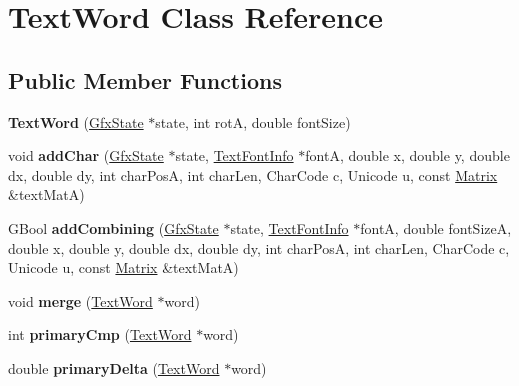\hypertarget{class_text_word}{}\section{Text\+Word Class Reference}
\label{class_text_word}
\subsection*{Public Member Functions}
\begin{DoxyCompactItemize}
\item 
\mbox{\label{class_text_word_a51bc923c6e3480cd018573e600261f74}} 
{\bfseries Text\+Word} (\hyperlink{class_gfx_state}{Gfx\+State} $\ast$state, int rotA, double font\+Size)
\item 
\mbox{\label{class_text_word_a66521a225689a5c12f66c81e25c1b551}} 
void {\bfseries add\+Char} (\hyperlink{class_gfx_state}{Gfx\+State} $\ast$state, \hyperlink{class_text_font_info}{Text\+Font\+Info} $\ast$fontA, double x, double y, double dx, double dy, int char\+PosA, int char\+Len, Char\+Code c, Unicode u, const \hyperlink{class_matrix}{Matrix} \&text\+MatA)
\item 
\mbox{\label{class_text_word_a161af72a57d83b89d424d17579ee97d3}} 
G\+Bool {\bfseries add\+Combining} (\hyperlink{class_gfx_state}{Gfx\+State} $\ast$state, \hyperlink{class_text_font_info}{Text\+Font\+Info} $\ast$fontA, double font\+SizeA, double x, double y, double dx, double dy, int char\+PosA, int char\+Len, Char\+Code c, Unicode u, const \hyperlink{class_matrix}{Matrix} \&text\+MatA)
\item 
\mbox{\label{class_text_word_aa0bd42d4ad298ea175c02dd6a530d47c}} 
void {\bfseries merge} (\hyperlink{class_text_word}{Text\+Word} $\ast$word)
\item 
\mbox{\label{class_text_word_a91580af19a0fd677003d2b3d3c5c5b74}} 
int {\bfseries primary\+Cmp} (\hyperlink{class_text_word}{Text\+Word} $\ast$word)
\item 
\mbox{\label{class_text_word_a858f4e99cfdde219281ae20992374fd2}} 
double {\bfseries primary\+Delta} (\hyperlink{class_text_word}{Text\+Word} $\ast$word)
\item 

\end{DoxyCompactItemize}
